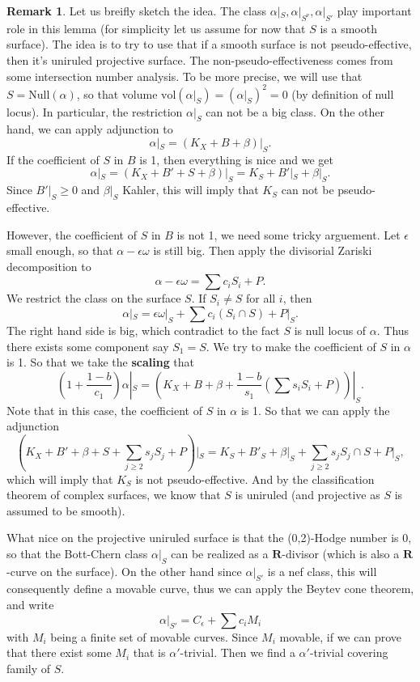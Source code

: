\documentclass[11pt]{article}
\theoremstyle{definition}
\newtheorem{remark}[theorem]{Remark}
\begin{document}
	\begin{remark}
		Let us breifly sketch the idea. The class $\alpha|_S, \alpha|_{S^\nu}, \alpha|_{S'}$ play important role in this lemma (for simplicity let us assume for now that $S$ is a smooth surface). The idea is to try to use that if a smooth surface is not pseudo-effective, then it's uniruled projective surface. The non-pseudo-effectiveness comes from some intersection number analysis. To be more precise, we will use that $S = \text{Null}(\alpha)$, so that volume $\text{vol}(\alpha|_S)  = (\alpha|_S)^2= 0$ (by definition of null locus). In particular, the restriction $\alpha|_S$ can not be a big class. On the other hand, we can apply adjunction to $$\alpha|_S  = (K_X+B+\beta)|_S.$$
		If the coefficient of $S$ in $B$ is 1, then everything is nice and we get $$\alpha|_S = (K_X+B ' + S + \beta)|_S = K_S+ B'|_S + \beta|_S.$$Since $B'|_S\ge 0$ and $\beta|_S$ Kahler, this will imply that $K_S$ can not be pseudo-effective. 
		
		However, the coefficient of $S$ in $B$ is not 1, we need some tricky arguement. Let $\epsilon$ small enough, so that $\alpha - \epsilon \omega$ is still big. Then apply the divisorial Zariski decomposition to $$\alpha - \epsilon \omega  =  \sum c_i S_i + P.$$
		We restrict the class on the surface $S$. If $S_i \ne S$ for all $i$, then $$\alpha|_S = \epsilon \omega|_S + \sum c_i (S_i \cap S) + P|_S.$$The right hand side is big, which contradict to the fact $S$ is null locus of $\alpha$. Thus there exists some component say $S_1 = S$. We try to make the coefficient of $S$ in $\alpha$ is 1. So that we take the \textbf{scaling} that $$(1 + \frac{1-b}{c_1})\alpha|_S= (K_X+B +\beta + \frac{1-b}{s_1}(\sum s_i S_i+ P))|_S.$$
		Note that in this case, the coefficient of $S$ in $\alpha$ is 1. So that we can apply the adjunction $$(K_X+B' + \beta + S + \sum_{j\ge 2} s_j S_j + P)|_S = K_S+B'_S + \beta|_S + \sum_{j \ge 2} s_jS_j \cap S+ P|_S,$$which will imply that $K_S$ is not pseudo-effective. And by the classification theorem of complex surfaces, we know that $S$ is uniruled (and projective as $S$ is assumed to be smooth). 
		
		What nice on the projective uniruled surface is that the (0,2)-Hodge number is 0, so that the Bott-Chern class $\alpha|_S$ can be realized as a $\mathbf{R}$-divisor (which is also a $\mathbf{R}$-curve on the surface). On the other hand since $\alpha|_{S'}$ is a nef class, this will consequently define a movable curve, thus we can apply the Beytev cone theorem, and write $$\alpha|_{S'} = C_{\epsilon }+ \sum  c_i M_i$$
		with $M_i$ being a finite set of movable curves. Since $M_i$ movable, if we can prove that there exist some $M_i$ that is $\alpha'$-trivial. Then we find a $\alpha'$-trivial covering family of $S$. 
		

\end{remark}
\end{document}
